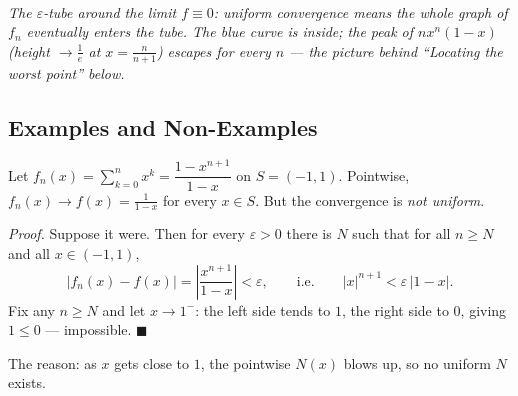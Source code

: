 \documentclass[11pt]{report}
\newcommand{\figcap}[1]{\\[1.5mm]\parbox{0.92\textwidth}{\small\itshape #1}}
\begin{document}
\begin{center}
\figcap{The $\varepsilon$-tube around the limit $f \equiv 0$: uniform convergence means the whole graph of $f_n$ eventually enters the tube. The blue curve is inside; the peak of $n x^n(1-x)$ (height $\to \tfrac1e$ at $x = \tfrac{n}{n+1}$) escapes for every $n$ --- the picture behind ``Locating the worst point'' below.}
\end{center}


\subsection{Examples and Non-Examples}

\begin{exbox}
Let $f_n(x) = \sum_{k=0}^n x^k = \dfrac{1 - x^{n+1}}{1-x}$ on $S = (-1,1)$. Pointwise, $f_n(x) \to f(x) = \tfrac{1}{1-x}$ for every $x \in S$. But the convergence is \emph{not uniform}.

\emph{Proof.} Suppose it were. Then for every $\varepsilon > 0$ there is $N$ such that for all $n \geq N$ and all $x \in (-1,1)$,
\[
|f_n(x) - f(x)| = \left| \frac{x^{n+1}}{1-x} \right| < \varepsilon, \qquad \text{i.e.} \qquad |x|^{n+1} < \varepsilon\,|1-x|.
\]
Fix any $n \geq N$ and let $x \to 1^-$: the left side tends to $1$, the right side to $0$, giving $1 \leq 0$ --- impossible. \hfill $\blacksquare$

The reason: as $x$ gets close to $1$, the pointwise $N(x)$ blows up, so no uniform $N$ exists.
\end{exbox}
\end{document}
